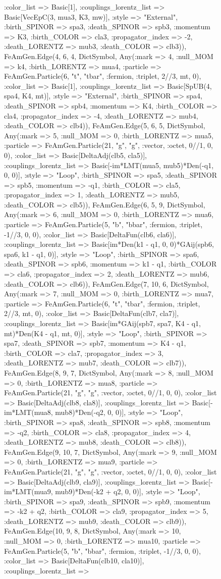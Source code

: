 \documentclass{revtex4}
\begin{document}
\begin{figure}[!htb]
\begin{center}
{:color_list => Basic[1], :couplings_lorentz_list => Basic[VecEpC(3, mua3, K3, mw)], :style => "External", :birth_SPINOR => spa3, :death_SPINOR => spb3, :momentum => K3, :birth_COLOR => cla3, :propagator_index => -2, :death_LORENTZ => mub3, :death_COLOR => clb3)), FeAmGen.Edge(4, 6, 4, Dict{Symbol, Any}(:mark => 4, :null_MOM => k4, :birth_LORENTZ => mua4, :particle => FeAmGen.Particle(6, "t", "tbar", :fermion, :triplet, 2//3, mt, 0), :color_list => Basic[1], :couplings_lorentz_list => Basic[SpUB(4, spa4, K4, mt)], :style => "External", :birth_SPINOR => spa4, :death_SPINOR => spb4, :momentum => K4, :birth_COLOR => cla4, :propagator_index => -4, :death_LORENTZ => mub4, :death_COLOR => clb4)), FeAmGen.Edge(5, 6, 5, Dict{Symbol, Any}(:mark => 5, :null_MOM => 0, :birth_LORENTZ => mua5, :particle => FeAmGen.Particle(21, "g", "g", :vector, :octet, 0//1, 0, 0), :color_list => Basic[DeltaAdj(clb5, cla5)], :couplings_lorentz_list => Basic[-im*LMT(mua5, mub5)*Den(-q1, 0, 0)], :style => "Loop", :birth_SPINOR => spa5, :death_SPINOR => spb5, :momentum => -q1, :birth_COLOR => cla5, :propagator_index => 1, :death_LORENTZ => mub5, :death_COLOR => clb5)), FeAmGen.Edge(6, 5, 9, Dict{Symbol, Any}(:mark => 6, :null_MOM => 0, :birth_LORENTZ => mua6, :particle => FeAmGen.Particle(5, "b", "bbar", :fermion, :triplet, -1//3, 0, 0), :color_list => Basic[DeltaFun(clb6, cla6)], :couplings_lorentz_list => Basic[im*Den(k1 - q1, 0, 0)*GAij(spb6, spa6, k1 - q1, 0)], :style => "Loop", :birth_SPINOR => spa6, :death_SPINOR => spb6, :momentum => k1 - q1, :birth_COLOR => cla6, :propagator_index => 2, :death_LORENTZ => mub6, :death_COLOR => clb6)), FeAmGen.Edge(7, 10, 6, Dict{Symbol, Any}(:mark => 7, :null_MOM => 0, :birth_LORENTZ => mua7, :particle => FeAmGen.Particle(6, "t", "tbar", :fermion, :triplet, 2//3, mt, 0), :color_list => Basic[DeltaFun(clb7, cla7)], :couplings_lorentz_list => Basic[im*GAij(spb7, spa7, K4 - q1, mt)*Den(K4 - q1, mt, 0)], :style => "Loop", :birth_SPINOR => spa7, :death_SPINOR => spb7, :momentum => K4 - q1, :birth_COLOR => cla7, :propagator_index => 3, :death_LORENTZ => mub7, :death_COLOR => clb7)), FeAmGen.Edge(8, 9, 7, Dict{Symbol, Any}(:mark => 8, :null_MOM => 0, :birth_LORENTZ => mua8, :particle => FeAmGen.Particle(21, "g", "g", :vector, :octet, 0//1, 0, 0), :color_list => Basic[DeltaAdj(clb8, cla8)], :couplings_lorentz_list => Basic[-im*LMT(mua8, mub8)*Den(-q2, 0, 0)], :style => "Loop", :birth_SPINOR => spa8, :death_SPINOR => spb8, :momentum => -q2, :birth_COLOR => cla8, :propagator_index => 4, :death_LORENTZ => mub8, :death_COLOR => clb8)), FeAmGen.Edge(9, 10, 7, Dict{Symbol, Any}(:mark => 9, :null_MOM => 0, :birth_LORENTZ => mua9, :particle => FeAmGen.Particle(21, "g", "g", :vector, :octet, 0//1, 0, 0), :color_list => Basic[DeltaAdj(clb9, cla9)], :couplings_lorentz_list => Basic[-im*LMT(mua9, mub9)*Den(-k2 + q2, 0, 0)], :style => "Loop", :birth_SPINOR => spa9, :death_SPINOR => spb9, :momentum => -k2 + q2, :birth_COLOR => cla9, :propagator_index => 5, :death_LORENTZ => mub9, :death_COLOR => clb9)), FeAmGen.Edge(10, 9, 8, Dict{Symbol, Any}(:mark => 10, :null_MOM => 0, :birth_LORENTZ => mua10, :particle => FeAmGen.Particle(5, "b", "bbar", :fermion, :triplet, -1//3, 0, 0), :color_list => Basic[DeltaFun(clb10, cla10)], :couplings_lorentz_list => }
\end{center}
\end{figure}
\end{document}
